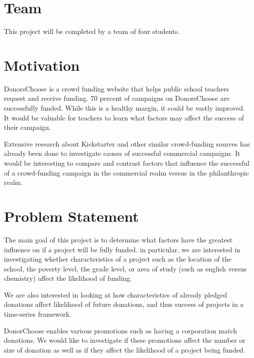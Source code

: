 \documentclass{article}
\begin{document}
 


\section{Team}
This project will be completed by a team of four students.

\section{Motivation}
DonorsChoose is a crowd funding website that helps public school teachers request and receive funding. 70 percent of campaigns on DonorsChoose are successfully funded. While this is a healthy margin, it could be vastly improved. It would be valuable for teachers to learn what factors may affect the success of their campaign.  

Extensive research about Kickstarter and other similar crowd-funding sources has already been done to investigate causes of successful commercial campaigns. It would be interesting to compare and contrast factors that influence the successful of a crowd-funding campaign in the commercial realm versus in the philanthropic realm.

\section{Problem Statement}
The main goal of this project is to determine what factors have the greatest influence on if a project will be fully funded.  in particular, we are interested in investigating whether characteristics of a project such as the location of the school, the poverty level, the grade level, or area of study (such as english versus chemistry) affect the likelihood of funding.  

We are also interested in looking at how characteristics of already pledged donations affect likelihood of future donations, and thus success of projects in a time-series framework.

DonorChoose enables various promotions such as having a corporation match donations.  We would like to investigate if these promotions affect the number or size of donation as well as if they affect the likelihood of a project being funded.
\end{document}
